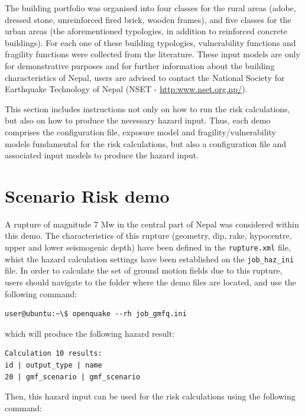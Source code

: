The building portfolio was organised into four classes for the rural areas (adobe, dressed stone, unreinforced fired brick, wooden frames), and five classes for the urban areas (the aforementioned typologies, in addition to reinforced concrete buildings). For each one of these building typologies, \glspl{vulnerability function} and \glspl{fragility function} were collected from the literature. These input models are only for demonstrative purposes and for further information about the building characteristics of Nepal, users are advised to contact the National Society for Earthquake Technology of Nepal (NSET - \href{http://www.nset.org.np/}{http:www.nset.org.np/}).

This section includes instructions not only on how to run the risk calculations, but also on how to produce the necessary hazard input. Thus, each demo comprises the configuration file, exposure model and fragility/vulnerability models fundamental for the risk calculations, but also a configuration file and associated input models to produce the hazard input.

\section{Scenario Risk demo}
A rupture of magnitude 7 Mw in the central part of Nepal was considered within this demo. The characteristics of this rupture (geometry, dip, rake, hypocentre,  upper and lower seismogenic depth) have been defined in the \verb+rupture.xml+ file, whist the hazard calculation settings have been established on the \verb+job_haz_ini+ file. In order to calculate the set of ground motion fields due to this rupture, users should navigate to the folder where the demo files are located, and use the following command:

\begin{Verbatim}[frame=single, commandchars=\\\{\}, samepage=true]
user@ubuntu:~\$ openquake --rh job_gmfq.ini
\end{Verbatim}

which will produce the following hazard result:

\begin{Verbatim}[frame=single, commandchars=\\\{\}, samepage=true]
Calculation 10 results:
id | output_type | name
20 | gmf_scenario | gmf_scenario
\end{Verbatim}

Then, this hazard input can be used for the risk calculations using the following command:

